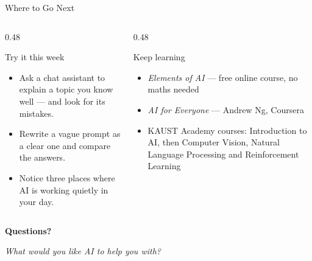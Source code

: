 \begin{frame}{Where to Go Next}
    \begin{columns}[T]
        \begin{column}{0.48\textwidth}
            \begin{block}{Try it this week}
                \begin{itemize}
                    \setlength\itemsep{0.4em}
                    \item Ask a chat assistant to explain a topic you know well --- and look for its mistakes.
                    \item Rewrite a vague prompt as a clear one and compare the answers.
                    \item Notice three places where AI is working quietly in your day.
                \end{itemize}
            \end{block}
        \end{column}
        \begin{column}{0.48\textwidth}
            \begin{block}{Keep learning}
                \begin{itemize}
                    \setlength\itemsep{0.4em}
                    \item \textit{Elements of AI} --- free online course, no maths needed
                    \item \textit{AI for Everyone} --- Andrew Ng, Coursera
                    \item KAUST Academy courses: Introduction to AI, then Computer Vision,
                          Natural Language Processing and Reinforcement Learning
                \end{itemize}
            \end{block}
        \end{column}
    \end{columns}
\end{frame}

\begin{frame}{}
    \centering
    \Huge \textbf{Questions?}

    \vspace{1.5em}
    \large \textit{What would you like AI to help you with?}
\end{frame}
